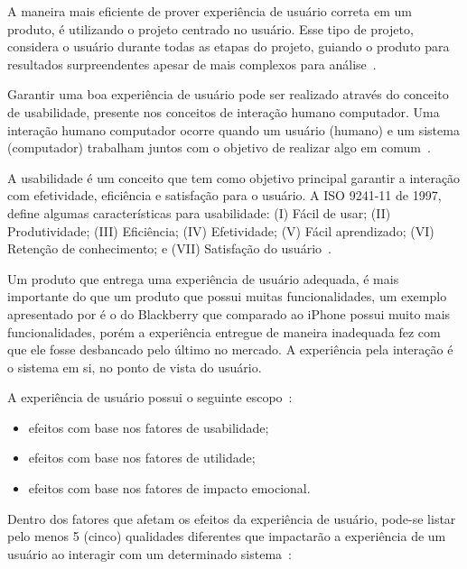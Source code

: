 A maneira mais eficiente de prover experiência de usuário correta em um produto, é utilizando o projeto centrado no usuário. Esse tipo de projeto, considera o usuário durante todas as etapas do projeto, guiando o produto para resultados surpreendentes apesar de mais complexos para análise~\cite{garrett:2010}.

Garantir uma boa experiência de usuário pode ser realizado através do conceito de usabilidade, presente nos conceitos de interação humano computador. Uma interação humano computador ocorre quando um usuário (humano) e um sistema (computador) trabalham juntos com o objetivo de realizar algo em comum~\cite{hartson:2012}.

A usabilidade é um conceito que tem como objetivo principal garantir a interação com efetividade, eficiência e satisfação para o usuário. A ISO 9241-11 de 1997, define algumas características para usabilidade: (I) Fácil de usar; (II) Produtividade; (III) Eficiência; (IV) Efetividade; (V) Fácil aprendizado; (VI) Retenção de conhecimento; e (VII) Satisfação do usuário~\cite{hartson:2012}.

Um produto que entrega uma experiência de usuário adequada, é mais importante do que um produto que possui muitas funcionalidades, um exemplo apresentado por  é o do Blackberry que comparado ao iPhone possui muito mais funcionalidades, porém a experiência entregue de maneira inadequada fez com que ele fosse desbancado pelo último no mercado. A experiência pela interação é o sistema em si, no ponto de vista do usuário.

A experiência de usuário possui o seguinte escopo~\cite{hartson:2012}:

\begin{itemize}
    \item efeitos com base nos fatores de usabilidade;
    \item efeitos com base nos fatores de utilidade;
    \item efeitos com base nos fatores de impacto emocional.
\end{itemize}

Dentro dos fatores que afetam os efeitos da experiência de usuário, pode-se listar pelo menos 5 (cinco) qualidades diferentes que impactarão a experiência de um usuário ao interagir com um determinado sistema~\cite{hartson:2012}:

